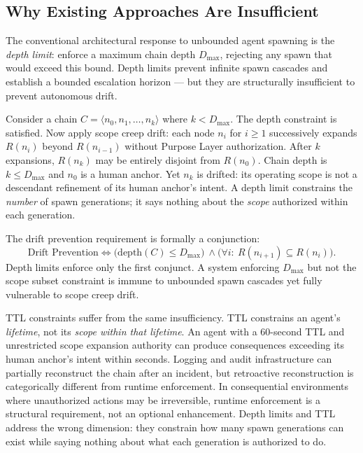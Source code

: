 \subsection{Why Existing Approaches Are Insufficient}

The conventional architectural response to unbounded agent spawning is the \emph{depth limit}: enforce a maximum chain depth $D_{\max}$, rejecting any spawn that would exceed this bound. Depth limits prevent infinite spawn cascades and establish a bounded escalation horizon — but they are structurally insufficient to prevent autonomous drift.

Consider a chain $C = \langle n_0, n_1, \ldots, n_k \rangle$ where $k < D_{\max}$. The depth constraint is satisfied. Now apply scope creep drift: each node $n_i$ for $i \geq 1$ successively expands $R(n_i)$ beyond $R(n_{i-1})$ without Purpose Layer authorization. After $k$ expansions, $R(n_k)$ may be entirely disjoint from $R(n_0)$. Chain depth is $k \leq D_{\max}$ and $n_0$ is a human anchor. Yet $n_k$ is drifted: its operating scope is not a descendant refinement of its human anchor's intent. A depth limit constrains the \emph{number} of spawn generations; it says nothing about the \emph{scope} authorized within each generation.

The drift prevention requirement is formally a conjunction:
\begin{equation}
\text{Drift Prevention} \iff \bigl(\text{depth}(C) \leq D_{\max}\bigr)\ \land \bigl(\forall i:\ R(n_{i+1}) \subseteq R(n_i)\bigr).
\label{eq:intro-drift-prevention}
\end{equation}
Depth limits enforce only the first conjunct. A system enforcing $D_{\max}$ but not the scope subset constraint is immune to unbounded spawn cascades yet fully vulnerable to scope creep drift.

TTL constraints suffer from the same insufficiency. TTL constrains an agent's \emph{lifetime}, not its \emph{scope within that lifetime}. An agent with a 60-second TTL and unrestricted scope expansion authority can produce consequences exceeding its human anchor's intent within seconds. Logging and audit infrastructure can partially reconstruct the chain after an incident, but retroactive reconstruction is categorically different from runtime enforcement. In consequential environments where unauthorized actions may be irreversible, runtime enforcement is a structural requirement, not an optional enhancement. Depth limits and TTL address the wrong dimension: they constrain how many spawn generations can exist while saying nothing about what each generation is authorized to do.

